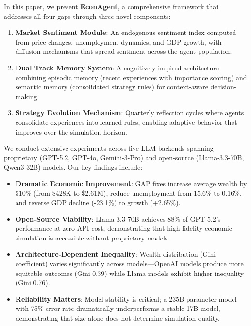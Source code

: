 \documentclass[runningheads]{llncs}
\begin{document}
In this paper, we present \textbf{EconAgent}, a comprehensive framework that addresses all four gaps through three novel components:

\begin{enumerate}
    \item \textbf{Market Sentiment Module}: An endogenous sentiment index computed from price changes, unemployment dynamics, and GDP growth, with diffusion mechanisms that spread sentiment across the agent population.

    \item \textbf{Dual-Track Memory System}: A cognitively-inspired architecture combining episodic memory (recent experiences with importance scoring) and semantic memory (consolidated strategy rules) for context-aware decision-making.

    \item \textbf{Strategy Evolution Mechanism}: Quarterly reflection cycles where agents consolidate experiences into learned rules, enabling adaptive behavior that improves over the simulation horizon.
\end{enumerate}

We conduct extensive experiments across five LLM backends spanning proprietary (GPT-5.2, GPT-4o, Gemini-3-Pro) and open-source (Llama-3.3-70B, Qwen3-32B) models. Our key findings include:

\begin{itemize}
    \item \textbf{Dramatic Economic Improvement}: GAP fixes increase average wealth by 510\% (from \$428K to \$2.61M), reduce unemployment from 15.6\% to 0.16\%, and reverse GDP decline (-23.1\%) to growth (+2.65\%).

    \item \textbf{Open-Source Viability}: Llama-3.3-70B achieves 88\% of GPT-5.2's performance at zero API cost, demonstrating that high-fidelity economic simulation is accessible without proprietary models.

    \item \textbf{Architecture-Dependent Inequality}: Wealth distribution (Gini coefficient) varies significantly across models—OpenAI models produce more equitable outcomes (Gini 0.39) while Llama models exhibit higher inequality (Gini 0.76).

    \item \textbf{Reliability Matters}: Model stability is critical; a 235B parameter model with 75\% error rate dramatically underperforms a stable 17B model, demonstrating that size alone does not determine simulation quality.
\end{itemize}
\end{document}
